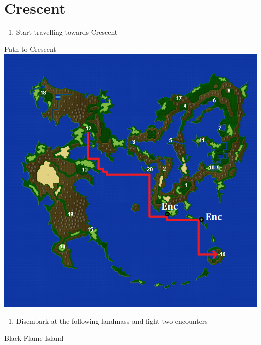 \chapter{Crescent}

\vspace{\baselineskip}

\begin{paracol}{2}

\begin{enumerate}
    \item Start travelling towards Crescent
\end{enumerate}

\switchcolumn
\begin{misc}{Path to Crescent}
    \includegraphics[scale=0.8]{../Graphics/Maps/2. To Crescent.png}
\end{misc}

\switchcolumn*
\begin{enumerate}[resume]
    \item Disembark at the following landmass and fight two encounters
\end{enumerate}

\switchcolumn
\begin{steproute}{Black Flame Island}
\end{steproute}


\end{paracol}
